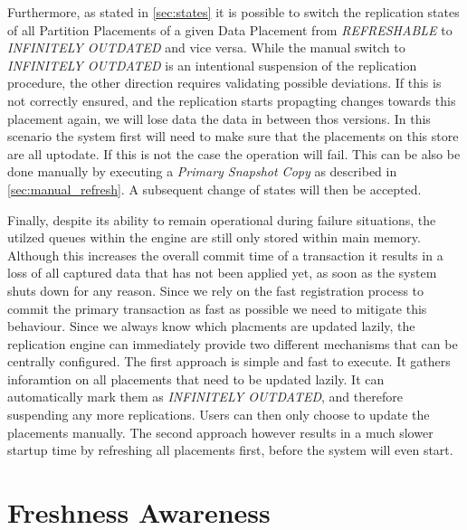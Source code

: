 Furthermore, as stated in \ref{sec:states} it is possible to switch the replication states of all Partition Placements of a given Data Placement from \emph{REFRESHABLE} to 
\emph{INFINITELY OUTDATED} and vice versa.
While the manual switch to \emph{INFINITELY OUTDATED} is an intentional suspension of the replication procedure, the other direction requires validating possible deviations.
If this is not correctly ensured, and the replication starts propagting changes towards this placement again, we will lose data the data in between thos versions.
In this scenario the system first will need to make sure that the placements on this store are all uptodate. If this is not the case the operation will fail. 
This can be also be done manually by executing a \emph{Primary Snapshot Copy} as described in \ref{sec:manual_refresh}. A subsequent change of states will then be accepted.

Finally, despite its ability to remain operational during failure situations, the utilzed queues within the engine are still only stored within main memory.
Although this increases the overall commit time of a transaction it results in a loss of all captured data that has not been applied yet, as soon as the system 
shuts down for any reason. Since we rely on the fast registration process to commit the primary transaction as fast as possible we need to mitigate this behaviour.
Since we always know which placments are updated lazily, the replication engine can immediately provide two different mechanisms that can be centrally configured. 
The first approach is simple and fast to execute. It gathers inforamtion on all placements that need to be updated lazily. It can automatically mark them as 
\emph{INFINITELY OUTDATED}, 
and therefore suspending any more replications. Users can then only choose to update the placements manually.
The second approach however results in a much slower startup time by refreshing all placements first, before the system will even start.









\section{Freshness Awareness}

